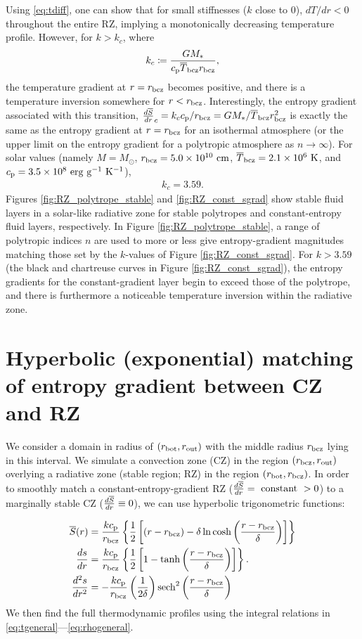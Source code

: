 \documentclass[12pt]{article}
\numberwithin{equation}{section}
\begin{document}
Using \eqref{eq:tdiff}, one can show that for small stiffnesses ($k$ close to $0$), $dT/dr < 0$ throughout the entire RZ, implying a monotonically decreasing temperature profile. However, for $k>k_c$, where
\begin{align}
k_c\coloneqq \frac{GM_*}{c_{\rm{p}} \overline{T}_{\rm{bcz}} r_{\rm{bcz}}},
\end{align}
the temperature gradient at $r=r_{\rm{bcz}}$ becomes positive, and there is a temperature inversion somewhere for $r<r_{\rm{bcz}}$. Interestingly, the entropy gradient associated with this transition, $\frac{d\overline{S}}{dr}_c=k_cc_{\rm{p}}/r_{\rm{bcz}}=GM_*/\overline{T}_{\rm{bcz}} r_{\rm{bcz}}^2$ is exactly the same as the entropy gradient at $r=r_{\rm{bcz}}$ for an isothermal atmosphere (or the upper limit on the entropy gradient for a polytropic atmosphere as $n\rightarrow\infty$). For solar values (namely $M=M_\odot$, $r_{\rm{bcz}} = 5.0\times10^{10}\ \rm{cm}$, $\overline{T}_{\rm{bcz}} = 2.1\times10^6\ \rm{K}$, and $\cp=3.5\times10^8\ \rm{erg\ g^{-1}\ K^{-1}}$),
\begin{align}
k_c = 3.59.
\label{eq:kc_solar}
\end{align}
Figures \ref{fig:RZ_polytrope_stable} and \ref{fig:RZ_const_sgrad} show stable fluid layers in a solar-like radiative zone for stable polytropes and constant-entropy fluid layers, respectively. In Figure \ref{fig:RZ_polytrope_stable}, a range of polytropic indices $n$ are used to more or less give entropy-gradient magnitudes matching those set by the $k$-values of Figure \ref{fig:RZ_const_sgrad}. For $k>3.59$ (the black and chartreuse curves in Figure \ref{fig:RZ_const_sgrad}), the entropy gradients for the constant-gradient layer begin to exceed those of the polytrope, and there is furthermore a noticeable temperature inversion within the radiative zone.

\section{Hyperbolic (exponential)  matching of entropy gradient between CZ and RZ}
We consider a domain in radius of $(r_{\rm{bot}},r_{\rm{out}})$ with the middle radius $r_{\rm{bcz}}$ lying in this interval. We simulate a convection zone (CZ) in the region $(r_{\rm{bcz}}, r_{\rm{out}})$ overlying a radiative zone (stable region; RZ) in the region $(r_{\rm{bot}},r_{\rm{bcz}})$. In order to smoothly match a constant-entropy-gradient RZ ($\frac{d\overline{S}}{dr}=\ \rm{constant}\ > 0$) to a marginally stable CZ ($\frac{d\overline{S}}{dr}\equiv 0$), we can use hyperbolic trigonometric functions:

\begin{align}
\overline{S}(r) &= \frac{kc_{\rm{p}}}{r_{\rm{bcz}}}\left\{\frac{1}{2}\left[(r-r_{\rm{bcz}}) -\delta\ln\cosh{\left(\frac{r-r_{\rm{bcz}}}{\delta}\right)}\right]\right\}\label{eq:s_tanh_transition}\\
\frac{ds}{dr} &= \frac{kc_{\rm{p}}}{r_{\rm{bcz}}}\left\{\frac{1}{2}\left[1 - \tanh{\left(\frac{r-r_{\rm{bcz}}}{\delta}\right)}\right]\right\}.\label{eq:dsdr_tanh_transition}\\
\frac{d^2s}{dr^2} &= -\frac{kc_{\rm{p}}}{r_{\rm{bcz}}}\left(\frac{1}{2\delta}\right){\rm{sech}}^2\left(\frac{r-r_{\rm{bcz}}}{\delta}\right)
\end{align}
We then find the full thermodynamic profiles using the integral relations in \eqref{eq:tgeneral}---\eqref{eq:rhogeneral}.
\end{document}
